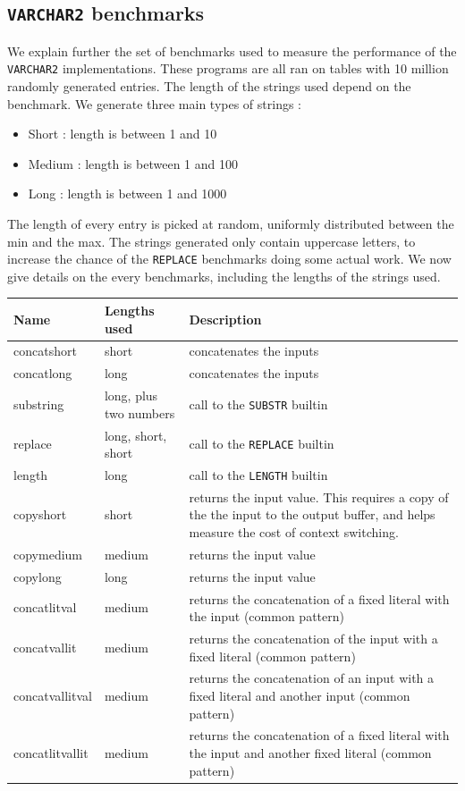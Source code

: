 \documentclass[twoside,11pt,a4paper]{article}
\newcommand{\pls}[1]{\small\texttt{#1}\normalsize}
\newcommand{\plstype}[1]{\pls{#1}}
\newcommand{\varchar}{\plstype{VARCHAR2}}
\begin{document}
\subsection*{\varchar{} benchmarks}

We explain further the set of benchmarks used to measure the performance of the \varchar{} implementations. These programs are all ran on tables with 10 million randomly generated entries. The length of the strings used depend on the benchmark. We generate three main types of strings :
\begin{itemize}
\item Short : length is between 1 and 10
\item Medium : length is between 1 and 100
\item Long : length is between 1 and 1000
\end{itemize}

The length of every entry is picked at random, uniformly distributed between the min and the max. The strings generated only contain uppercase letters, to increase the chance of the \pls{REPLACE} benchmarks doing some actual work. We now give details on the every benchmarks, including the lengths of the strings used.
\begin{center}
\begin{tabular}{|l|P{3cm}|p{9cm}|}
\hline
Name				& Lengths used		& Description\\
\hline
concatshort		& short				& concatenates the inputs\\
concatlong		& long				& concatenates the inputs\\
substring		& long, plus two numbers			& call to the \pls{SUBSTR} builtin\\
replace			& long, short, short	& call to the \pls{REPLACE} builtin\\
length			& long				& call to the \pls{LENGTH} builtin\\
copyshort		& short				& returns the input value. This requires a copy of the the input to the output buffer, and helps measure the cost of context switching.\\
copymedium		& medium				& returns the input value\\
copylong			& long				& returns the input value\\
concatlitval		& medium				& returns the concatenation of a fixed literal with the input (common pattern)\\
concatvallit		& medium				& returns the concatenation of the input with a fixed literal (common pattern)\\
concatvallitval	& medium				& returns the concatenation of an input with a fixed literal and another input (common pattern)\\
concatlitvallit	& medium				& returns the concatenation of a fixed literal with the input and another fixed literal (common pattern)\\
\hline
\end{tabular}
\end{center}
\end{document}
